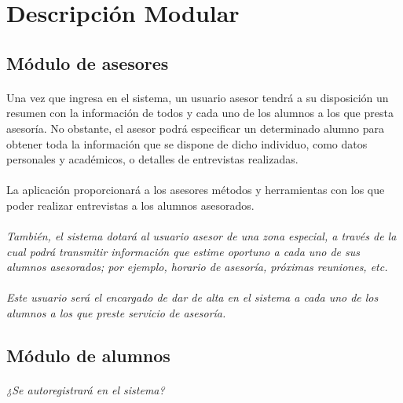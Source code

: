 \section{Descripción Modular}

   \subsection{Módulo de asesores}

      \paragraph{}Una vez que ingresa en el sistema, un usuario asesor tendrá
      a su disposición un resumen con la información de todos y cada uno de los
      alumnos a los que presta asesoría. No obstante, el asesor podrá
      especificar un determinado alumno para obtener toda la información que
      se dispone de dicho individuo, como datos personales y académicos, o
      detalles de entrevistas realizadas.

      \paragraph{}La aplicación proporcionará a los asesores métodos y
      herramientas con los que poder realizar entrevistas a los alumnos
      asesorados.

      \paragraph{}\textit{También, el sistema dotará al usuario asesor de una
      zona especial, a través de la cual podrá transmitir información que estime
      oportuno a cada uno de sus alumnos asesorados; por ejemplo, horario
      de asesoría, próximas reuniones, etc.}

      \paragraph{}\textit{Este usuario será el encargado de dar de alta en el
      sistema a cada uno de los alumnos a los que preste servicio de asesoría.}

   \subsection{Módulo de alumnos}

      \paragraph{}\textit{¿Se autoregistrará en el sistema?}

